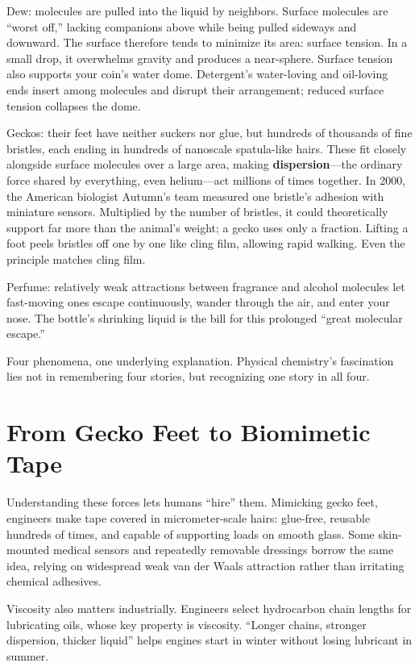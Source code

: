 Dew: molecules are pulled into the liquid by neighbors. Surface molecules are ``worst off,'' lacking companions above while being pulled sideways and downward. The surface therefore tends to minimize its area: surface tension. In a small drop, it overwhelms gravity and produces a near-sphere. Surface tension also supports your coin's water dome. Detergent's water-loving and oil-loving ends insert among molecules and disrupt their arrangement; reduced surface tension collapses the dome.

Geckos: their feet have neither suckers nor glue, but hundreds of thousands of fine bristles, each ending in hundreds of nanoscale spatula-like hairs. These fit closely alongside surface molecules over a large area, making \textbf{dispersion}---the ordinary force shared by everything, even helium---act millions of times together. In 2000, the American biologist Autumn's team measured one bristle's adhesion with miniature sensors. Multiplied by the number of bristles, it could theoretically support far more than the animal's weight; a gecko uses only a fraction. Lifting a foot peels bristles off one by one like cling film, allowing rapid walking. Even the principle matches cling film.

Perfume: relatively weak attractions between fragrance and alcohol molecules let fast-moving ones escape continuously, wander through the air, and enter your nose. The bottle's shrinking liquid is the bill for this prolonged ``great molecular escape.''

Four phenomena, one underlying explanation. Physical chemistry's fascination lies not in remembering four stories, but recognizing one story in all four.

\section{From Gecko Feet to Biomimetic Tape}

Understanding these forces lets humans ``hire'' them. Mimicking gecko feet, engineers make tape covered in micrometer-scale hairs: glue-free, reusable hundreds of times, and capable of supporting loads on smooth glass. Some skin-mounted medical sensors and repeatedly removable dressings borrow the same idea, relying on widespread weak van der Waals attraction rather than irritating chemical adhesives.

Viscosity also matters industrially. Engineers select hydrocarbon chain lengths for lubricating oils, whose key property is viscosity. ``Longer chains, stronger dispersion, thicker liquid'' helps engines start in winter without losing lubricant in summer.

